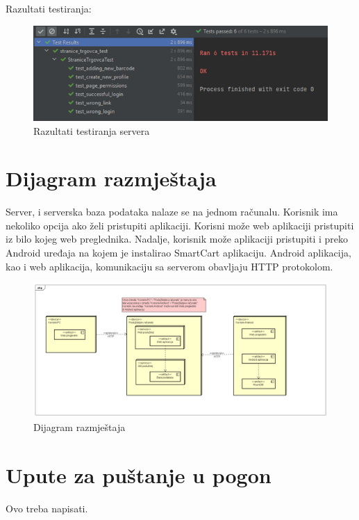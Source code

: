 			Razultati testiranja:
			\begin{figure}[H]
				\centering
				\includegraphics{slike/serverTest.png}
				\caption{Razultati testiranja servera}
				\label{fig:test_server}
			\end{figure}
		\eject
	\section{Dijagram razmještaja}
			Server, i serverska baza podataka nalaze se na jednom računalu. Korisnik ima nekoliko opcija ako želi pristupiti aplikaciji. Korisni može web aplikaciji pristupiti iz bilo kojeg web preglednika. Nadalje, korisnik može aplikaciji pristupiti i preko Android uređaja na kojem je instalirao SmartCart aplikaciju. Android aplikacija, kao i web aplikacija, komunikaciju sa serverom obavljaju HTTP protokolom.
		
			\begin{figure}[H]
				\centering
				\includegraphics[width=1.0\linewidth]{dijagrami/deployment.png}
				\caption{Dijagram razmještaja}
				\label{fig:deployment}
			\end{figure}
		\eject
	\section{Upute za puštanje u pogon}
		Ovo treba napisati.
		\eject
			